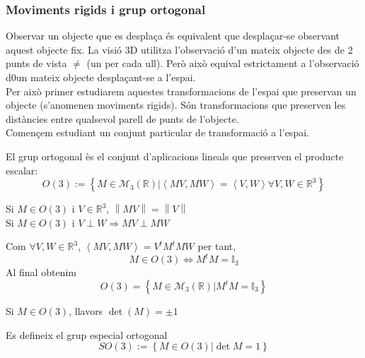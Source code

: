 \documentclass[../main.tex]{subfiles}
\begin{document}
\subsubsection{Moviments rigids i grup ortogonal}
Observar un objecte que es desplaça és equivalent que desplaçar-se observant aquest objecte fix.
La visió 3D utilitza l'observació d'un mateix objecte des de 2 punts de vista $\neq$ (un per cada
ull). Però això equival estrictament a l'observació d0un mateix objecte desplaçant-se a l'espai.\\
Per això primer estudiarem aquestes transformacions de l'espai que preservan un objecte (s'anomenen
moviments rigids). Són transformacions que preserven les distàncies entre qualsevol parell de punts
de l'objecte.\\
Començem estudiant un conjunt particular de transformació a l'espai.
\begin{definicio}
    El grup ortogonal ès el conjunt d'aplicacions lineals que preserven el producte escalar:
    \begin{displaymath}
        O(3) := \left\{M \in \mathcal{M}_3\left(\mathbb{R}\right) | \left\langle MV, MW \right\rangle = \left\langle V, W\right\rangle \forall V, W \in \mathbb{R}^3 \right\} 
    \end{displaymath}
\end{definicio}
\begin{obs}
    Si $M \in O(3)$ i $V \in \mathbb{R}^3$, $\left\lVert MV\right\rVert = \left\lVert V\right\rVert$\\
    Si $M\in O(3)$ i $V\perp W \Rightarrow MV \perp MW$
\end{obs}
Com $\forall V, W \in \mathbb{R}^3$, $\left\langle MV, MW\right\rangle = V^tM^tMW$ per tant,
\begin{displaymath}
    M \in O(3) \Leftrightarrow M^tM = \mathbb{I}_3  
\end{displaymath}
Al final obtenim
\begin{displaymath}
    O(3) = \left\{M \in \mathcal{M}_3\left(\mathbb{R}\right) | M^tM = \mathbb{I}_3\right\}
\end{displaymath}
\begin{proposicio}
    Si $M \in O(3)$, llavors $\det\left(M\right) = \pm 1$
\end{proposicio}
\begin{definicio}
    Es defineix el grup especial ortogonal
    \begin{displaymath}
        SO(3) := \left\{M \in O(3) | \det{M} = 1\right\} 
    \end{displaymath}
\end{definicio}
\end{document}
